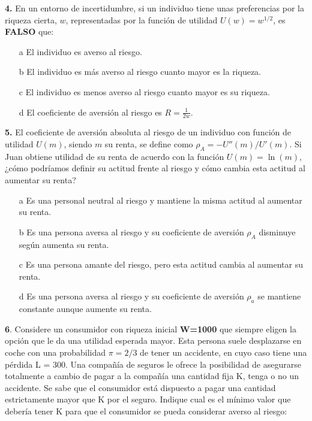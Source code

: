 \documentclass{nuevotema}
\begin{document}
\textbf{4.} En un entorno de incertidumbre, si un individuo tiene unas preferencias por la riqueza cierta, $w$, representadas por la función de utilidad $U(w) = w^{1/2}$, es \textbf{FALSO} que: 

\begin{itemize}
	\item[a] El individuo es averso al riesgo.
	\item[b] El individuo es más averso al riesgo cuanto mayor es la riqueza.
	\item[c] El individuo es menos averso al riesgo cuanto mayor es su riqueza.
	\item[d] El coeficiente de aversión al riesgo es $R = \frac{1}{2w}$.
\end{itemize}

\textbf{5.} El coeficiente de aversión absoluta al riesgo de un individuo con función de utilidad $U(m)$, siendo $m$ su renta, se define como $\rho_A = - U''(m) / U'(m)$. Si Juan obtiene utilidad de su renta de acuerdo con la función $U(m) = \ln (m)$, ¿cómo podríamos definir su actitud frente al riesgo y cómo cambia esta actitud al aumentar su renta?

\begin{itemize}
	\item[a] Es una personal neutral al riesgo y mantiene la misma actitud al aumentar su renta.
	\item[b] Es una persona aversa al riesgo y su coeficiente de aversión $\rho_A$ disminuye según aumenta su renta.
	\item[c] Es una persona amante del riesgo, pero esta actitud cambia al aumentar su renta.
	\item[d] Es una persona aversa al riesgo y su coeficiente de aversión $\rho_a$ se mantiene constante aunque aumente su renta.
\end{itemize}


\textbf{6}. Considere un consumidor con riqueza inicial \textbf{W=1000} que siempre eligen la opción que le da una utilidad esperada mayor. Esta persona suele desplazarse en coche con una probabilidad $\pi = 2/3$ de tener un accidente, en cuyo caso tiene una pérdida L = 300. Una compañía de seguros le ofrece la posibilidad de asegurarse totalmente a cambio de pagar a la compañía una cantidad fija K, tenga o no un accidente. Se sabe que el consumidor está dispuesto a pagar una cantidad estrictamente mayor que K por el seguro. Indique cual es el mínimo valor que debería tener K para que el consumidor se pueda considerar averso al riesgo:
\end{document}

